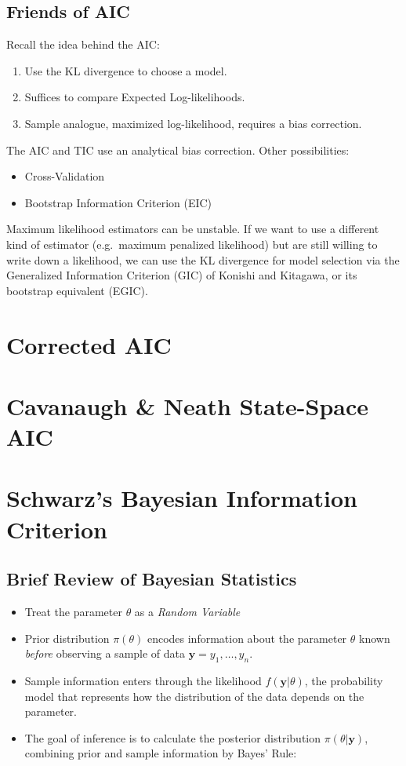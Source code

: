 \documentclass[12pt]{article}
\theoremstyle{definition}
\begin{document}
\subsection{Friends of AIC}
Recall the idea behind the AIC:
	\begin{enumerate}
		\item Use the KL divergence to choose a model.
		\item Suffices to compare Expected Log-likelihoods. 
		\item Sample analogue, maximized log-likelihood, requires a bias correction.
	\end{enumerate}
The AIC and TIC use an analytical bias correction. Other possibilities:
	\begin{itemize}
		\item Cross-Validation
		\item Bootstrap Information Criterion (EIC)
	\end{itemize}
Maximum likelihood estimators can be unstable. If we want to use a different kind of estimator (e.g.\ maximum penalized likelihood) but are still willing to write down a likelihood, we can use the KL divergence for model selection via the Generalized Information Criterion (GIC) of Konishi and Kitagawa, or its bootstrap equivalent (EGIC).


\section{Corrected AIC}

\section{Cavanaugh \& Neath State-Space AIC}


\section{Schwarz's Bayesian Information Criterion}

\subsection{Brief Review of Bayesian Statistics}
	\begin{itemize}
		\item Treat the parameter $\theta$ as a \emph{Random Variable}
		\item Prior distribution $\pi(\theta)$ encodes information about the parameter $\theta$ known \emph{before} observing a sample of data $\mathbf{y} = y_1, \hdots, y_n$.
		\item Sample information enters through the likelihood $f(\mathbf{y}|\theta)$, the probability model that represents how the distribution of the data depends on the parameter.
		\item The goal of inference is to calculate the posterior distribution $\pi(\theta|\mathbf{y})$, combining prior and sample information by Bayes' Rule:
	\end{itemize}   
	
\end{document}
